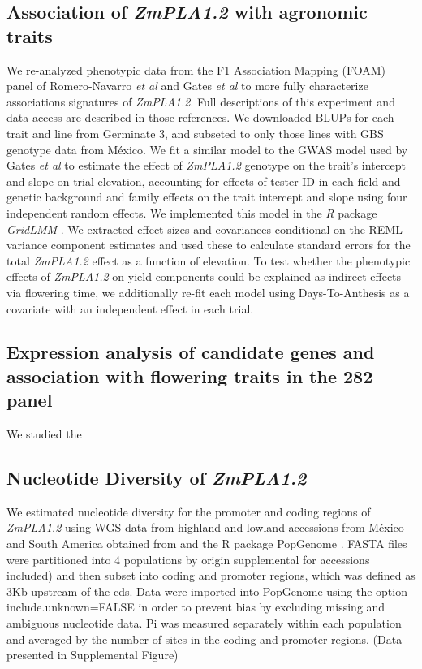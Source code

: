 \documentclass[9pt,twocolumn,twoside]{BioRxiv}
\begin{document}
\subsection{Association of \textit{ZmPLA1.2} with agronomic traits}
We re-analyzed phenotypic data from the F1 Association Mapping (FOAM) panel of Romero-Navarro \textit{et al} \cite{Romero_Navarro2017-cn} and Gates \textit{et al} \cite{Gates2019-xu} to more fully characterize associations signatures of \textit{ZmPLA1.2}. 
Full descriptions of this experiment and data access are described in those references. 
We downloaded BLUPs for each trait and line from Germinate 3, and subseted to only those lines with GBS genotype data from México. 
We fit a similar model to the GWAS model used by Gates \textit{et al} \cite{Gates2019-xu} to estimate the effect of \textit{ZmPLA1.2} genotype on the trait's intercept and slope on trial elevation, accounting for effects of tester ID in each field and genetic background and family effects on the trait intercept and slope using four independent random effects. 
We implemented this model in the \textit{R} package \textit{GridLMM} \cite{Runcie2019-Gr}. 
We extracted effect sizes and covariances conditional on the REML variance component estimates and used these to calculate standard errors for the total \textit{ZmPLA1.2} effect as a function of elevation. 
To test whether the phenotypic effects of \textit{ZmPLA1.2} on yield components could be explained as indirect effects via flowering time, we additionally re-fit each model using Days-To-Anthesis as a covariate with an independent effect in each trial.

\subsection{Expression analysis of candidate genes and association with flowering traits in the 282 panel}
We studied the

\subsection{Nucleotide Diversity of \textit{ZmPLA1.2} }
We estimated nucleotide diversity for the promoter and coding regions of \textit{ZmPLA1.2} using WGS data from highland and lowland accessions from México and South America obtained from \cite{Wang2017-bc} and the R package PopGenome \cite{Pfeifer2014-bg}. 
FASTA files were partitioned into 4 populations by origin  supplemental for accessions included) and then subset into coding and promoter regions, which was defined as 3Kb upstream of the cds. 
Data were imported into PopGenome using the option include.unknown=FALSE in order to prevent bias by excluding missing and ambiguous nucleotide data.
Pi was measured separately within each population and averaged by the number of sites in the coding and promoter regions. (Data presented in Supplemental Figure)
\end{document}

